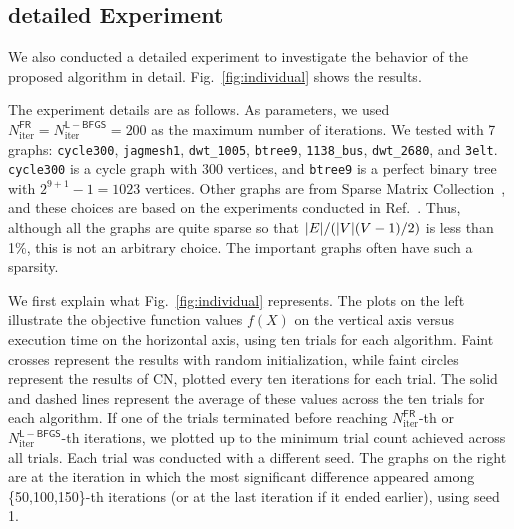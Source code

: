 \documentclass[dvipdfmx,10pt,journal,compsoc]{IEEEtran}
\begin{document}
\subsection{detailed Experiment}\label{ssec:exprDetail}

We also conducted a detailed experiment to investigate the behavior of the proposed algorithm in detail. Fig.~\ref{fig:individual} shows the results.

The experiment details are as follows.
As parameters, we used $N_\mathrm{iter}^\mathsf{FR} = N_\mathrm{iter}^\mathsf{L-BFGS} = 200$ as the maximum number of iterations.
We tested with 7 graphs: \texttt{cycle300}, \texttt{jagmesh1}, \texttt{dwt\_1005}, \texttt{btree9}, \texttt{1138\_bus}, \texttt{dwt\_2680}, and \texttt{3elt}. \texttt{cycle300} is a cycle graph with 300 vertices, and \texttt{btree9} is a perfect binary tree with $2^{9+1}-1=1023$ vertices. Other graphs are from Sparse Matrix Collection~\cite{davis2011university}, and these choices are based on the experiments conducted in Ref.~\cite{zhengGraphDrawingStochastic2019}. Thus, although all the graphs are quite sparse so that $\abs{E} / (\abs{V}(V-1)/2)$ is less than 1\%, this is not an arbitrary choice. The important graphs often have such a sparsity.

We first explain what Fig.~\ref{fig:individual} represents.
The plots on the left illustrate the objective function values $f(X)$ on the vertical axis versus execution time on the horizontal axis, using ten trials for each algorithm.
Faint crosses represent the results with random initialization, while faint circles represent the results of \textsf{CN}, plotted every ten iterations for each trial.
The solid and dashed lines represent the average of these values across the ten trials for each algorithm.
If one of the trials terminated before reaching $N_\mathrm{iter}^\mathsf{FR}$-th or $N_\mathrm{iter}^\mathsf{L-BFGS}$-th iterations, we plotted up to the minimum trial count achieved across all trials. Each trial was conducted with a different seed.
The graphs on the right are at the iteration in which the most significant difference appeared among \{50,100,150\}-th iterations (or at the last iteration if it ended earlier), using seed 1.
\end{document}
